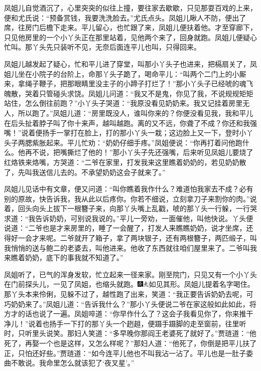 凤姐儿自觉酒沉了，心里突突的似往上撞，要往家去歇歇，只见那耍百戏的上来，便和尤氏说：“预备赏钱，我要洗洗脸去。”尤氏点头。凤姐儿瞅人不防，便出了席，往房门后檐下走来。平儿留心，也忙跟了来，凤姐儿便扶着他。才至穿廊下，只见他房里的一个小丫头正在那里站着，见他两个来了，回身就跑。凤姐儿便疑心忙叫。那丫头先只装听不见，无奈后面连平儿也叫，只得回来。

凤姐儿越发起了疑心，忙和平儿进了穿堂，叫那小丫头子也进来，把槅扇关了，凤姐儿坐在小院子的台阶上，命那丫头子跪了，喝命平儿：“叫两个二门上的小厮来，拿绳子鞭子，把那眼睛里没主子的小蹄子打烂了！”那小丫头子已经唬的魂飞魄散，哭着只管碰头求饶。凤姐儿问道：“我又不是鬼，你见了我，不说规规矩矩站住，怎么倒往前跑？”小丫头子哭道：“我原没看见奶奶来。我又记挂着房里无人，所以跑了。”凤姐儿道：“房里既没人，谁叫你来的？你便没看见我，我和平儿在后头扯着脖子叫了你十来声，越叫越跑。离的又不远，你聋了不成？你还和我强嘴！”说着便扬手一掌打在脸上，打的那小丫头一栽；这边脸上又一下，登时小丫头子两腮紫胀起来。平儿忙劝：“奶奶仔细手疼。”凤姐便说：“你再打着问他跑什么。他再不说，把嘴撕烂了他的！”那小丫头子先还强嘴，后来听见凤姐儿要烧了红烙铁来烙嘴，方哭道：“二爷在家里，打发我来这里瞧着奶奶的，若见奶奶散了，先叫我送信儿去的。不承望奶奶这会子就来了。”

凤姐儿见话中有文章，便又问道：“叫你瞧着我作什么？难道怕我家去不成？必有别的原故，快告诉我，我从此以后疼你。你若不细说，立刻拿刀子来割你的肉。”说着，回头向头上拔下一根簪子来，向那丫头嘴上乱戳，唬的那丫头一行躲，一行哭求道：“我告诉奶奶，可别说我说的。”平儿一旁劝，一面催他，叫他快说。丫头便说道：“二爷也是才来房里的，睡了一会醒了，打发人来瞧瞧奶奶，说才坐席，还得好一会才来呢。二爷就开了箱子，拿了两块银子，还有两根簪子，两匹缎子，叫我悄悄的送与鲍二的老婆去，叫他进来。他收了东西就往咱们屋里来了。二爷叫我来瞧着奶奶，底下的事我就不知道了。”

凤姐听了，已气的浑身发软，忙立起来一径来家。刚至院门，只见又有一个小丫头在门前探头儿，一见了凤姐，也缩头就跑。{\includegraphics[width=3mm]{../Images/00004}\includegraphics[width=3mm]{../Images/00012}\footnotesize \kaishu 如见其形。}凤姐儿提着名字喝住。那丫头本来伶俐，见躲不过了，越性跑了出来，笑道：“我正要告诉奶奶去呢，可巧奶奶来了。”凤姐儿道：“告诉我什么？”那小丫头便说二爷在家这般如此如此，将方才的话也说了一遍。凤姐啐道：“你早作什么了？这会子我看见你了，你来推干净儿！”说着也扬手一下打的那丫头一个趔趄，便蹑手蹑脚的走至窗前，往里听时，只听里头说笑。那妇人笑道：“多早晚你那阎王老婆死了就好了。”贾琏道：“他死了，再娶一个也是这样，又怎么样呢？”那妇人道：“他死了，你倒是把平儿扶了正，只怕还好些。”贾琏道：“如今连平儿他也不叫我沾一沾了。平儿也是一肚子委曲不敢说。我命里怎么就该犯了‘夜叉星’。”

